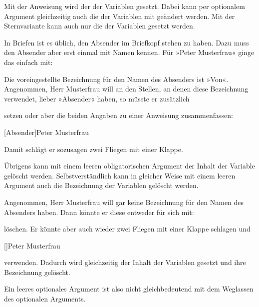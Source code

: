 \begin{Declaration}
\end{Declaration}
Mit der Anweisung  wird der  der Variablen
 gesetzt. Dabei kann per optionalem Argument gleichzeitig auch die
 der Variablen mit geändert werden. Mit der
Sternvariante  kann auch nur die  der
Variablen  gesetzt werden.
\begin{Example}
  In Briefen ist es üblich, den Absender im Briefkopf stehen zu haben. Dazu
  muss \KOMAScript{} den Absender aber erst einmal mit Namen kennen. Für
  »Peter Musterfrau« ginge das einfach mit:
\begin{lstcode}
\end{lstcode}
  Die voreingestellte Bezeichnung für den Namen des Absenders ist
  »Von«. Angenommen, Herr Musterfrau will %
  \iffalse aber \fi %
  an den Stellen, an denen \KOMAScript{} diese Bezeichnung verwendet, lieber
  »Absender« haben, so müsste er zusätzlich
\begin{lstcode}
\end{lstcode}
  setzen oder aber die beiden Angaben zu einer Anweisung zusammenfassen:
\begin{lstcode}
  [Absender]{Peter Musterfrau}
\end{lstcode}
  Damit schlägt er sozusagen zwei Fliegen mit einer Klappe.
\end{Example}
Übrigens kann mit einem leeren obligatorischen Argument 
der Inhalt der Variable gelöscht werden. Selbstverständlich kann in
gleicher Weise mit einem leeren Argument  auch die
Bezeichnung der Variablen gelöscht werden.
\begin{Example}
  Angenommen, Herr Musterfrau will gar keine Bezeichnung für den Namen des
  Absenders haben. Dann könnte er diese entweder für sich mit:
\begin{lstcode}
\end{lstcode}
  löschen. Er könnte aber auch wieder zwei Fliegen mit einer Klappe
  schlagen und
\begin{lstcode}
  []{Peter Musterfrau}
\end{lstcode}
  verwenden. Dadurch wird gleichzeitig der Inhalt der Variablen gesetzt und
  ihre Bezeichnung gelöscht.%
\end{Example}%
\iftrue%
Ein leeres optionales Argument ist also nicht
gleichbedeutend mit dem Weglassen des optionalen Arguments.%
\else %
\vskip -1\ht\strutbox plus .75\strutbox%
\fi%
\EndIndexGroup

